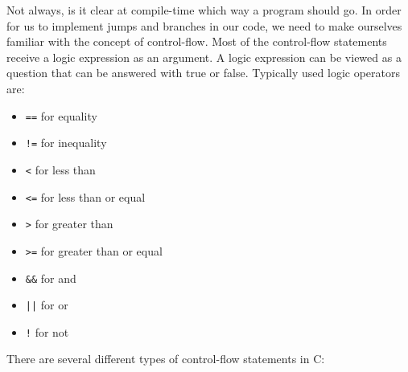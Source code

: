 \documentclass{dcbl/challenge}
\begin{document}
Not always, is it clear at compile-time which way a program should go. 
In order for us to implement jumps and branches in our code, we need to make ourselves familiar with the concept of control-flow. 
Most of the control-flow statements receive a logic expression as an argument.
A logic expression can be viewed as a question that can be answered with true or false.
Typically used logic operators are:
\begin{itemize}
    \item \texttt{==} for equality
    \item \texttt{!=} for inequality
    \item \texttt{<} for less than
    \item \texttt{<=} for less than or equal
    \item \texttt{>} for greater than
    \item \texttt{>=} for greater than or equal
    \item \texttt{\&\&} for and
    \item \texttt{||} for or
    \item \texttt{!} for not
\end{itemize}
There are several different types of control-flow statements in C:
\end{document}
